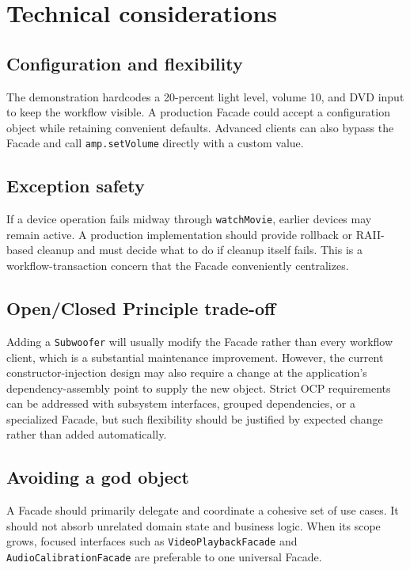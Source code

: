 \documentclass[11pt,a4paper]{report}
\begin{document}
\section{Technical considerations}
\subsection{Configuration and flexibility}
The demonstration hardcodes a 20-percent light level, volume 10, and DVD input
to keep the workflow visible. A production Facade could accept a configuration
object while retaining convenient defaults. Advanced clients can also bypass
the Facade and call \texttt{amp.setVolume} directly with a custom value.

\subsection{Exception safety}
If a device operation fails midway through \texttt{watchMovie}, earlier
devices may remain active. A production implementation should provide rollback
or RAII-based cleanup and must decide what to do if cleanup itself fails. This
is a workflow-transaction concern that the Facade conveniently centralizes.

\subsection{Open/Closed Principle trade-off}
Adding a \texttt{Subwoofer} will usually modify the Facade rather than every
workflow client, which is a substantial maintenance improvement. However, the
current constructor-injection design may also require a change at the
application's dependency-assembly point to supply the new object. Strict OCP
requirements can be addressed with subsystem interfaces, grouped dependencies,
or a specialized Facade, but such flexibility should be justified by expected
change rather than added automatically.

\subsection{Avoiding a god object}
A Facade should primarily delegate and coordinate a cohesive set of use cases.
It should not absorb unrelated domain state and business logic. When its scope
grows, focused interfaces such as \texttt{VideoPlaybackFacade} and
\texttt{AudioCalibrationFacade} are preferable to one universal Facade.
\end{document}
